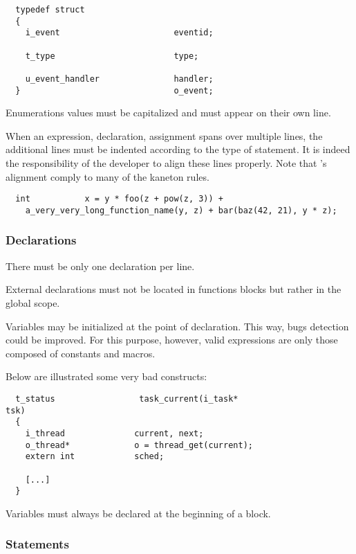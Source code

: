 \begin{verbatim}
  typedef struct
  {
    i_event                       eventid;

    t_type                        type;

    u_event_handler               handler;
  }                               o_event;
\end{verbatim}

Enumerations values must be capitalized and must appear on their own line.

When an expression, declaration, assignment \etc{} spans over multiple lines,
the additional lines must be indented according to the type of statement.
It is indeed the responsibility of the developer to align these lines
properly. Note that 's alignment comply to many of the
kaneton rules.

\begin{verbatim}
  int           x = y * foo(z + pow(z, 3)) +
    a_very_very_long_function_name(y, z) + bar(baz(42, 21), y * z);
\end{verbatim}


\subsubsection{Declarations}

There must be only one declaration per line.

External declarations must not be located in functions blocks but rather in the
global scope.

Variables may be initialized at the point of declaration. This way, bugs
detection could be improved. For this purpose, however, valid expressions
are only those composed of constants and macros.

Below are illustrated some very bad constructs:

\begin{verbatim}
  t_status                 task_current(i_task*                    tsk)
  {
    i_thread              current, next;
    o_thread*             o = thread_get(current);
    extern int            sched;

    [...]
  }
\end{verbatim}

Variables must always be declared at the beginning of a block.


\subsubsection{Statements}

